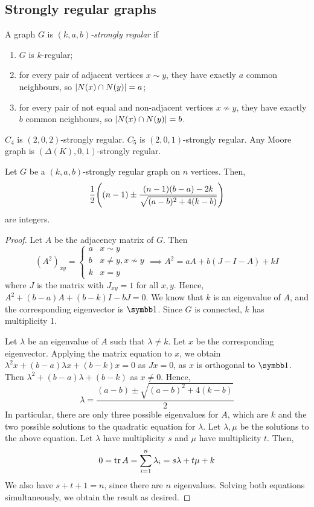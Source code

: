 \subsection{Strongly regular graphs}
\begin{definition}
	A graph \( G \) is \emph{\( (k, a, b) \)-strongly regular} if
	\begin{enumerate}
		\item \( G \) is \( k \)-regular;
		\item for every pair of adjacent vertices \( x \sim y \), they have exactly \( a \) common neighbours, so \( \abs{N(x) \cap N(y)} = a \);
		\item for every pair of not equal and non-adjacent vertices \( x \not\sim y \), they have exactly \( b \) common neighbours, so \( \abs{N(x) \cap N(y)} = b \).
	\end{enumerate}
\end{definition}
\begin{example}
	\( C_4 \) is \( (2, 0, 2) \)-strongly regular.
	\( C_5 \) is \( (2, 0, 1) \)-strongly regular.
	Any Moore graph is \( (\Delta(K), 0, 1) \)-strongly regular.
\end{example}
\begin{theorem}
	Let \( G \) be a \( (k, a, b) \)-strongly regular graph on \( n \) vertices.
	Then,
	\[ \frac{1}{2}\qty((n-1) \pm \frac{(n-1)(b-a) - 2k}{\sqrt{(a-b)^2 + 4(k-b)}}) \]
	are integers.
\end{theorem}
\begin{proof}
	Let \( A \) be the adjacency matrix of \( G \).
	Then
	\[ (A^2)_{xy} = \begin{cases}
		a & x \sim y \\
		b & x \neq y, x \not\sim y \\
		k & x = y
	\end{cases} \implies A^2 = aA + b(J-I-A) + kI \]
	where \( J \) is the matrix with \( J_{xy} = 1 \) for all \( x, y \).
	Hence, \( A^2 + (b-a)A + (b-k)I - bJ = 0 \).
	We know that \( k \) is an eigenvalue of \( A \), and the corresponding eigenvector is \( \symbb 1 \).
	Since \( G \) is connected, \( k \) has multiplicity 1.

	Let \( \lambda \) be an eigenvalue of \( A \) such that \( \lambda \neq k \).
	Let \( x \) be the corresponding eigenvector.
	Applying the matrix equation to \( x \), we obtain \( \lambda^2 x + (b-a)\lambda x + (b-k)x = 0 \) as \( Jx = 0 \), as \( x \) is orthogonal to \( \symbb 1 \).
	Then \( \lambda^2 + (b-a)\lambda + (b-k) \) as \( x \neq 0 \).
	Hence,
	\[ \lambda = \frac{(a-b) \pm \sqrt{(a-b)^2 + 4(k-b)}}{2} \]
	In particular, there are only three possible eigenvalues for \( A \), which are \( k \) and the two possible solutions to the quadratic equation for \( \lambda \).
	Let \( \lambda, \mu \) be the solutions to the above equation.
	Let \( \lambda \) have multiplicity \( s \) and \( \mu \) have multiplicity \( t \).
	Then,
	\[ 0 = \tr A = \sum_{i=1}^n \lambda_i = s\lambda + t\mu + k \]
	We also have \( s + t + 1 = n \), since there are \( n \) eigenvalues.
	Solving both equations simultaneously, we obtain the result as desired.
\end{proof}
